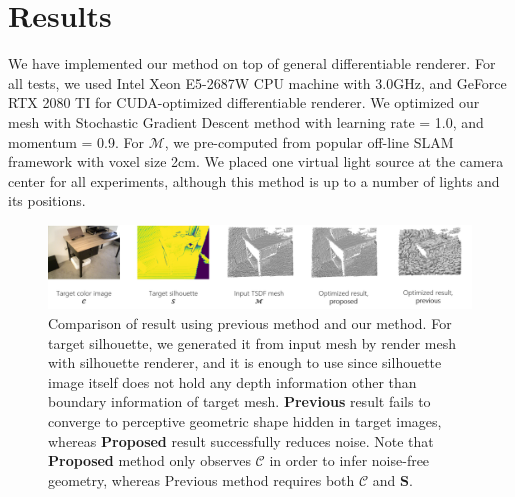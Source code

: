 \section{Results}
We have implemented our method on top of general differentiable renderer\cite{ravi2020accelerating}. 
For all tests, we used Intel Xeon E5-2687W CPU machine with 3.0GHz, and GeForce RTX 2080 TI for CUDA-optimized differentiable renderer. 
We optimized our mesh with Stochastic Gradient Descent method with learning rate = 1.0, and momentum = 0.9. 
For $\mathcal{M}$, we pre-computed from popular off-line SLAM framework \cite{zhou2018open3d} with voxel size 2cm.
We placed one virtual light source at the camera center for all experiments, although this method is up to a number of lights and its positions.

\begin{figure}
    \centering
    \includegraphics[width=\textwidth]{figures/4_result_comparison_with_previous_method.png}
    \caption{Comparison of result using previous method and our method. For target silhouette, we generated it from input mesh by render mesh with silhouette renderer, and it is enough to use since silhouette image itself does not hold any depth information other than boundary information of target mesh. \textbf{Previous} result fails to converge to perceptive geometric shape hidden in target images, whereas \textbf{Proposed} result successfully reduces noise. Note that \textbf{Proposed} method only observes $\mathbf{\mathcal{C}}$ in order to infer noise-free geometry, whereas Previous method requires both $\mathbf{\mathcal{C}}$ and $\mathbf{S}$.}
    \label{fig:comparison_with_previous_method}
\end{figure}

